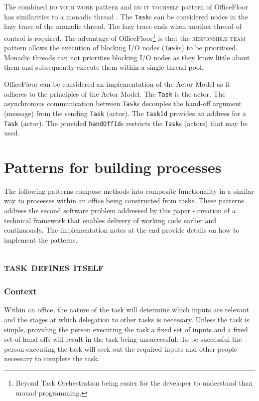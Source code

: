 \documentclass[prodmode]{style/acmlarge}
\begin{document}
The combined \textsc{do your work} pattern and \textsc{do it yourself} pattern
of OfficeFloor has similarities to a monadic thread \cite{monadic-thread}.  The
\texttt{Task}s can be considered nodes in the lazy trace of the monadic thread. 
The lazy trace ends when another thread of control is required.  The advantage of
OfficeFloor\footnote{Beyond Task Orchestration being easier for the developer to
understand than monad programming.} is that the \textsc{responsible team}
pattern allows the execution of blocking I/O nodes (\texttt{Task}s) to be
prioritised.  Monadic threads can not prioritise blocking I/O nodes as they know
little about them and subsequently execute them within a single thread pool.

OfficeFloor can be considered an implementation of the Actor Model \cite{actors}
as it adheres to the principles of the Actor Model.  The \texttt{Task} is the
actor.  The asynchronous communication between \texttt{Task}s decouples the
hand-off argument (message) from the sending \texttt{Task} (actor).  The
\texttt{taskId} provides an address for a \texttt{Task} (actor).  The provided
\texttt{handOffId}s restricts the \texttt{Task}s (actors) that may be used.




\section{Patterns for building processes}

The following patterns compose methods into composite functionality in a similar
way to processes within an office being constructed from tasks.  These patterns
address the second software problem addressed by this paper - creation of a
technical framework that enables delivery of working code earlier and
continuously.  The implementation notes at the end provide details on how to
implement the patterns.


\subsection{\textsc{\textbf{task defines itself}}}

\subsubsection*{Context} Within an office, the nature of the task will determine
which inputs are relevant and the stages at which delegation to other tasks is
necessary.  Unless the task is simple, providing the person executing the task a
fixed set of inputs and a fixed set of hand-offs will result in the task being
unsuccessful.  To be successful the person executing the task will seek out the
required inputs and other people necessary to complete the task.
\end{document}
